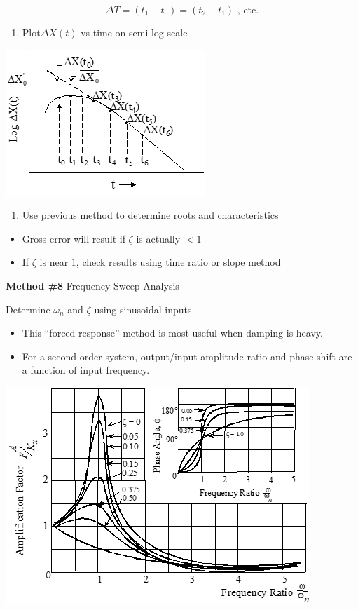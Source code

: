 \documentclass[
]{book}
\providecommand{\tightlist}{%
  \setlength{\itemsep}{0pt}\setlength{\parskip}{0pt}}
\begin{document}
\[
\Delta T = \left( t_1 - t_0 \right) = \left( t_2 - t_1 \right) \text{ , etc.}
\]

\begin{enumerate}
\def\labelenumi{\arabic{enumi}.}
\setcounter{enumi}{1}
\tightlist
\item
  Plot\(\Delta X \left(t \right)\) vs time on semi-log scale
\end{enumerate}

\includegraphics{media/08/image92.png}

\begin{enumerate}
\def\labelenumi{\arabic{enumi}.}
\setcounter{enumi}{2}
\tightlist
\item
  Use previous method to determine roots and characteristics
\end{enumerate}

\begin{itemize}
\tightlist
\item
  Gross error will result if \(\zeta\) is actually \(< 1\)
\item
  If \(\zeta\) is near \(1\), check results using time ratio or slope method
\end{itemize}

\textbf{Method \#8} Frequency Sweep Analysis

Determine \(\omega_n\) and \(\zeta\) using sinusoidal inputs.

\begin{itemize}
\tightlist
\item
  This ``forced response'' method is most useful when damping is heavy.
\item
  For a second order system, output/input amplitude ratio and phase shift are a function of input frequency.
\end{itemize}

\includegraphics{media/08/image93.png}
\end{document}
